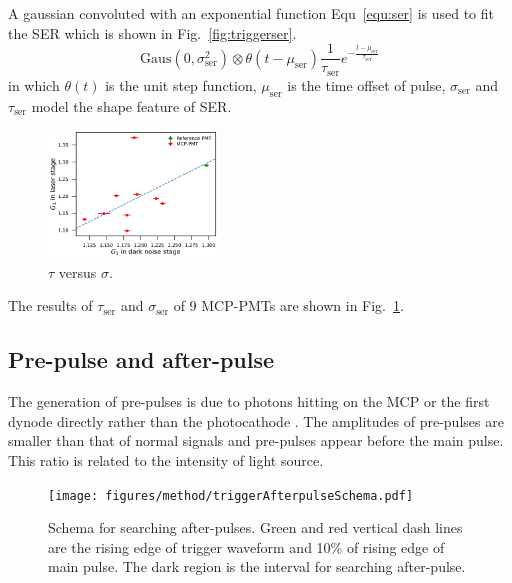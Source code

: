 A gaussian convoluted with an exponential function Equ~\eqref{equ:ser} is used to fit the SER which is shown in Fig.~\ref{fig:triggerser}.
\begin{equation}
    \label{equ:ser}
    \mathrm{Gaus}(0,\sigma_{\mathrm{ser}}^2)\otimes\theta(t-\mu_{\mathrm{ser}})\frac{1}{\tau_{\mathrm{ser}}}e^{-\frac{t-\mu_{\mathrm{ser}}}{\tau_{\mathrm{ser}}}}
\end{equation}
in which $\theta(t)$ is the unit step function, $\mu_{\mathrm{ser}}$ is the time offset of pulse, $\sigma_{\mathrm{ser}}$ and $\tau_{\mathrm{ser}}$ model the shape feature of SER. 
\begin{figure}[!htbp]
    \centering
    \includegraphics[width=0.4\textwidth,page=12]{figures/result/compare.pdf}
    \caption{$\tau$ versus $\sigma$.}
    \label{fig:sigmaCompare}
\end{figure}

The results of $\tau_{\mathrm{ser}}$ and $\sigma_{\mathrm{ser}}$ of 9 MCP-PMTs are shown in Fig.~\ref{fig:sigmaCompare}.

\subsection{Pre-pulse and after-pulse}
The generation of pre-pulses is due to photons hitting on the MCP or the first dynode directly rather than the photocathode \cite{JUNOMassTesting}. The amplitudes of pre-pulses are smaller than that of normal signals and  pre-pulses appear before the main pulse. This ratio is related to the intensity of light source.
\begin{figure}
    \centering
    \texttt{[image: figures/method/triggerAfterpulseSchema.pdf]}
    \caption{Schema for searching after-pulses. Green and red vertical dash lines are the rising edge of trigger waveform and 10\% of rising edge of main pulse. The dark region is the interval for searching after-pulse.}
    \label{fig:afterpulseSchema}
\end{figure}

